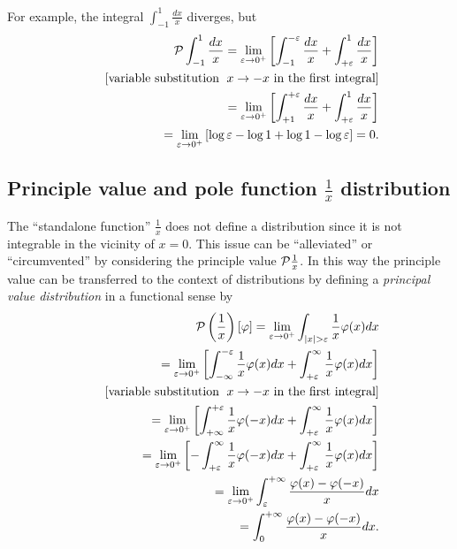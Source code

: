 {
\color{blue}
\bexample
For example, the integral
$ \int_{-1}^1 \frac{dx}{x}$ diverges, but
\begin{equation}
\begin{split}
{\cal P}
\int_{-1}^1 \frac{dx}{x}
= \lim_{\varepsilon \rightarrow 0^+}
\left[
\int_{-1}^{ -\varepsilon}\frac{dx}{x}
+
\int_{ +\varepsilon}^{1} \frac{dx}{x}
\right]
\\
\qquad
[\textrm{variable substitution }\; x\rightarrow -x \textrm{ in the first integral}]
\\
\qquad
=
\lim_{\varepsilon \rightarrow 0^+}
\left[
\int_{+1}^{ +\varepsilon}\frac{dx}{x}
+
\int_{ +\varepsilon}^{1} \frac{dx}{x}
\right]
\\
\qquad
=
\lim_{\varepsilon \rightarrow 0^+}
\left[
\log \varepsilon - \log 1  + \log 1  - \log \varepsilon
\right]
=0.
\end{split}
\end{equation}
\eexample
}

\subsection{Principle value and pole function $\frac{1}{x}$ distribution}

The ``standalone function'' $\frac{1}{x}$
does not define a distribution  since it is not integrable in
the vicinity of $x=0$.
This issue can be ``alleviated'' or ``circumvented''  by considering the principle value  ${\cal P}\frac{1}{x}$.
In this way the
principle value can be transferred to the context of distributions
by defining
a {\em principal value distribution} in a functional sense by
\begin{equation}
\begin{split}
{\cal P} \left(\frac{1}{x}\right) \left[\varphi\right]
=
\lim_{\varepsilon \rightarrow 0^+}
\int_{ \vert x \vert > \varepsilon }   \frac{1}{x}\varphi(x) dx
\\
\qquad
= \lim_{\varepsilon \rightarrow 0^+}
\left[
\int_{-\infty}^{ -\varepsilon} \frac{1}{x}\varphi(x) dx
+
\int_{ +\varepsilon}^{\infty} \frac{1}{x}\varphi(x) dx
\right]
\\
\qquad
[\textrm{variable substitution } \; x\rightarrow -x \textrm{ in the first integral}]
\\
\qquad
= \lim_{\varepsilon \rightarrow 0^+}
\left[
\int_{+\infty}^{ +\varepsilon} \frac{1}{x}\varphi(-x) dx
+
\int_{ +\varepsilon}^{\infty} \frac{1}{x}\varphi(x) dx
\right]
\\
\qquad
= \lim_{\varepsilon \rightarrow 0^+}
\left[
-\int_{ +\varepsilon}^{\infty} \frac{1}{x}\varphi(-x) dx
+
\int_{ +\varepsilon}^{\infty} \frac{1}{x}\varphi(x) dx
\right]
\\
\qquad
=
\lim_{\varepsilon \rightarrow 0^+}
\int_{\varepsilon}^{+\infty}   \frac{\varphi(x)-\varphi(-x)}{x} dx
\\
\qquad
=
\int_{0}^{+\infty}   \frac{\varphi(x)-\varphi(-x)}{x} dx
.
\end{split}
\label{2012-m-ch-di-prinvaldi}
\end{equation}



